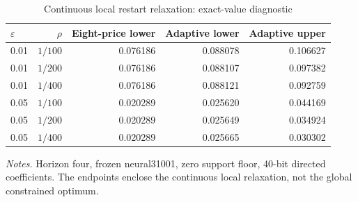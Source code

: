 \begin{table}[t]\centering\small\caption{Continuous local restart relaxation: exact-value diagnostic}\label{tab:local_summary}
\begin{tabular}{lrrrr}
\toprule
$\varepsilon$ & $\rho$ & Eight-price lower & Adaptive lower & Adaptive upper \\
\midrule
0.01 & $1/100$ & 0.076186 & 0.088078 & 0.106627 \\
0.01 & $1/200$ & 0.076186 & 0.088107 & 0.097382 \\
0.01 & $1/400$ & 0.076186 & 0.088121 & 0.092759 \\
0.05 & $1/100$ & 0.020289 & 0.025620 & 0.044169 \\
0.05 & $1/200$ & 0.020289 & 0.025649 & 0.034924 \\
0.05 & $1/400$ & 0.020289 & 0.025665 & 0.030302 \\
\bottomrule\end{tabular}
\par\smallskip\begin{minipage}{\linewidth}\footnotesize\emph{Notes.} Horizon four, frozen neural31001, zero support floor, 40-bit directed coefficients. The endpoints enclose the continuous local relaxation, not the global constrained optimum.\end{minipage}
\end{table}
